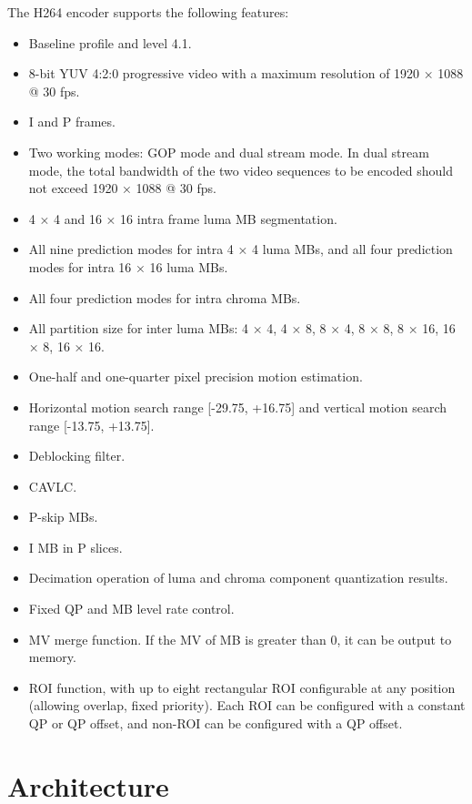 \documentclass[main\_\_EN.tex]{subfiles}
\begin{document}
The H264 encoder supports the following features:
\begin{itemize}
    \item Baseline profile and level 4.1.
    \item 8-bit YUV 4:2:0 progressive video with a maximum resolution of 1920 × 1088 @ 30 fps.
    \item I and P frames.
    \item Two working modes: GOP mode and dual stream mode. In dual stream mode, the total bandwidth of the two video sequences to be encoded should not exceed 1920 × 1088 @ 30 fps.
    \item 4 × 4 and 16 × 16 intra frame luma MB segmentation.
    \item All nine prediction modes for intra 4 × 4 luma MBs, and all four prediction modes for intra 16 × 16 luma MBs.
    \item All four prediction modes for intra chroma MBs.
    \item All partition size for inter luma MBs: 4 × 4, 4 × 8, 8 × 4, 8 × 8, 8 × 16, 16 × 8, 16 × 16.
    \item One-half and one-quarter pixel precision motion estimation.
    \item Horizontal motion search range [-29.75, +16.75] and vertical motion search range [-13.75, +13.75].
    \item Deblocking filter.
    \item CAVLC.
    \item P-skip MBs.
    \item I MB in P slices.
    \item Decimation operation of luma and chroma component quantization results.
    \item Fixed QP and MB level rate control.
    \item MV merge function. If the MV of MB is greater than 0, it can be output to memory.
    \item ROI function, with up to eight rectangular ROI configurable at any position (allowing overlap, fixed priority). Each ROI can be configured with a constant QP or QP offset, and non-ROI can be configured with a QP offset.
\end{itemize}



\section{Architecture}
\label{sec:h264enc-arch-overview}
\end{document}

